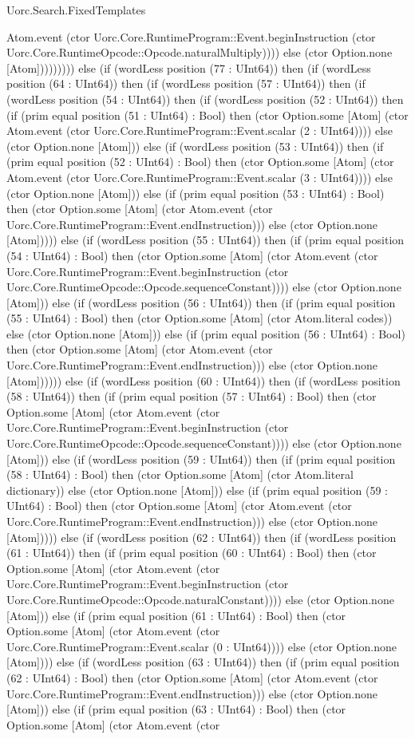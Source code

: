 \begin{lexlean}{Uorc.Search.FixedTemplates}
\begin{semanticmodule}
{Atom.event (ctor Uorc.Core.RuntimeProgram::Event.beginInstruction (ctor Uorc.Core.RuntimeOpcode::Opcode.naturalMultiply)))) else (ctor Option.none [Atom])))))))) else (if (wordLess position (77 : UInt64)) then (if (wordLess position (64 : UInt64)) then (if (wordLess position (57 : UInt64)) then (if (wordLess position (54 : UInt64)) then (if (wordLess position (52 : UInt64)) then (if (prim equal position (51 : UInt64) : Bool) then (ctor Option.some [Atom] (ctor Atom.event (ctor Uorc.Core.RuntimeProgram::Event.scalar (2 : UInt64)))) else (ctor Option.none [Atom])) else (if (wordLess position (53 : UInt64)) then (if (prim equal position (52 : UInt64) : Bool) then (ctor Option.some [Atom] (ctor Atom.event (ctor Uorc.Core.RuntimeProgram::Event.scalar (3 : UInt64)))) else (ctor Option.none [Atom])) else (if (prim equal position (53 : UInt64) : Bool) then (ctor Option.some [Atom] (ctor Atom.event (ctor Uorc.Core.RuntimeProgram::Event.endInstruction))) else (ctor Option.none [Atom])))) else (if (wordLess position (55 : UInt64)) then (if (prim equal position (54 : UInt64) : Bool) then (ctor Option.some [Atom] (ctor Atom.event (ctor Uorc.Core.RuntimeProgram::Event.beginInstruction (ctor Uorc.Core.RuntimeOpcode::Opcode.sequenceConstant)))) else (ctor Option.none [Atom])) else (if (wordLess position (56 : UInt64)) then (if (prim equal position (55 : UInt64) : Bool) then (ctor Option.some [Atom] (ctor Atom.literal codes)) else (ctor Option.none [Atom])) else (if (prim equal position (56 : UInt64) : Bool) then (ctor Option.some [Atom] (ctor Atom.event (ctor Uorc.Core.RuntimeProgram::Event.endInstruction))) else (ctor Option.none [Atom]))))) else (if (wordLess position (60 : UInt64)) then (if (wordLess position (58 : UInt64)) then (if (prim equal position (57 : UInt64) : Bool) then (ctor Option.some [Atom] (ctor Atom.event (ctor Uorc.Core.RuntimeProgram::Event.beginInstruction (ctor Uorc.Core.RuntimeOpcode::Opcode.sequenceConstant)))) else (ctor Option.none [Atom])) else (if (wordLess position (59 : UInt64)) then (if (prim equal position (58 : UInt64) : Bool) then (ctor Option.some [Atom] (ctor Atom.literal dictionary)) else (ctor Option.none [Atom])) else (if (prim equal position (59 : UInt64) : Bool) then (ctor Option.some [Atom] (ctor Atom.event (ctor Uorc.Core.RuntimeProgram::Event.endInstruction))) else (ctor Option.none [Atom])))) else (if (wordLess position (62 : UInt64)) then (if (wordLess position (61 : UInt64)) then (if (prim equal position (60 : UInt64) : Bool) then (ctor Option.some [Atom] (ctor Atom.event (ctor Uorc.Core.RuntimeProgram::Event.beginInstruction (ctor Uorc.Core.RuntimeOpcode::Opcode.naturalConstant)))) else (ctor Option.none [Atom])) else (if (prim equal position (61 : UInt64) : Bool) then (ctor Option.some [Atom] (ctor Atom.event (ctor Uorc.Core.RuntimeProgram::Event.scalar (0 : UInt64)))) else (ctor Option.none [Atom]))) else (if (wordLess position (63 : UInt64)) then (if (prim equal position (62 : UInt64) : Bool) then (ctor Option.some [Atom] (ctor Atom.event (ctor Uorc.Core.RuntimeProgram::Event.endInstruction))) else (ctor Option.none [Atom])) else (if (prim equal position (63 : UInt64) : Bool) then (ctor Option.some [Atom] (ctor Atom.event (ctor }
\end{semanticmodule}
\end{lexlean}

